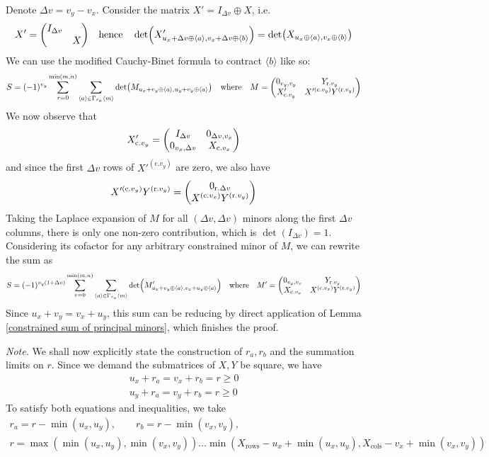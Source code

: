 \documentclass[12pt]{article}
\newcommand{\seq}[1]{\langle #1\rangle}
\begin{document}
	Denote $\Delta v = v_y-v_x$. Consider the matrix $X'=I_{\Delta v}\oplus X$, i.e.
	\begin{equation}
	X'=\mqty(\dmat{I_{\Delta v}, X})\qq{hence}\det(X'_{u_x+\Delta v\oplus\seq{a},v_x+\Delta v\oplus\seq{b}})=\det(X_{u_x\oplus\seq{a},v_x\oplus\seq{b}})
	\end{equation}
	We can use the modified Cauchy-Binet formula to contract $\seq{b}$ like so:
	\begin{align}
	S=(-1)^{v_y}\sum_{r=0}^{\min(m,n)}\sum_{\seq{a}\in\Gamma_{r_a}\seq{m}}\det(M_{u_x+v_y\oplus\seq{a}, u_y+v_y\oplus\seq{a}})\qq{where}M=\mqty(
		0_{v_y,v_y} & Y_{\text{r.} v_y}\\
		X'_{\text{c.} v_y} & X'^{(\text{c.} v_y)} Y^{(\text{r.} v_y)}
	)
	\end{align}
	We now observe that
	\begin{equation}
	X'_{\text{c.} v_y} = \mqty(
		I_{\Delta v} & 0_{\Delta v, v_x}\\
		0_{v_x, \Delta v} & X_{\text{c.} v_x}
	)
	\end{equation}
	and since the first $\Delta v$ rows of $X'^{(\text{c.} v_y)}$ are zero, we also have
	\begin{equation}
	X'^{(\text{c.} v_y)} Y^{(\text{r.} v_y)} = \mqty(0_{\text{r.} \Delta v} \\ X^{(\text{c.} v_x)} Y^{(\text{r.} v_y)})
	\end{equation}
	Taking the Laplace expansion of $M$ for all $(\Delta v,\Delta v)$ minors along the first $\Delta v$ columns, there is only one non-zero contribution, which is $\det(I_{\Delta v})=1$. Considering its cofactor for any arbitrary constrained minor of $M$, we can rewrite the sum as
	\begin{equation}
	S = (-1)^{v_y(1+\Delta v)}\sum_{r=0}^{\min(m,n)}\sum_{\seq{a}\in\Gamma_{r_a}\seq{m}}\det(M'_{u_x+v_y\oplus\seq{a},v_x+u_y\oplus\seq{a}})\qq{where}M'=\mqty(
		0_{v_y,v_x} & Y_{\text{r.} v_y}\\
		X_{\text{c.} v_x} & X^{(\text{c.} v_x)}Y^{(\text{r.} v_y)}
	)
	\end{equation}
	Since $u_x+v_y=v_x+u_y$, this sum can be reducing by direct application of Lemma \ref{constrained sum of principal minors}, which finishes the proof.
	
	\textit{Note.} We shall now explicitly state the construction of $r_a, r_b$ and the summation limits on $r$. Since we demand the submatrices of $X, Y$ be square, we have
	\begin{eqnarray}
	u_x + r_a = v_x + r_b = r \geq 0\\
	u_y + r_a = v_y + r_b = r \geq 0
	\end{eqnarray}
	To satisfy both equations and inequalities, we take
	\begin{multline}
	r_a=r - \min(u_x,u_y),\qquad r_b=r - \min(v_x,v_y),\\
	r = \max(\min(u_x, u_y), \min(v_x, v_y))\dots \min(X_{\text{rows}}-u_x+\min(u_x, u_y),X_{\text{cols}}-v_x+\min(v_x, v_y))
	\end{multline}
	
\end{document}
